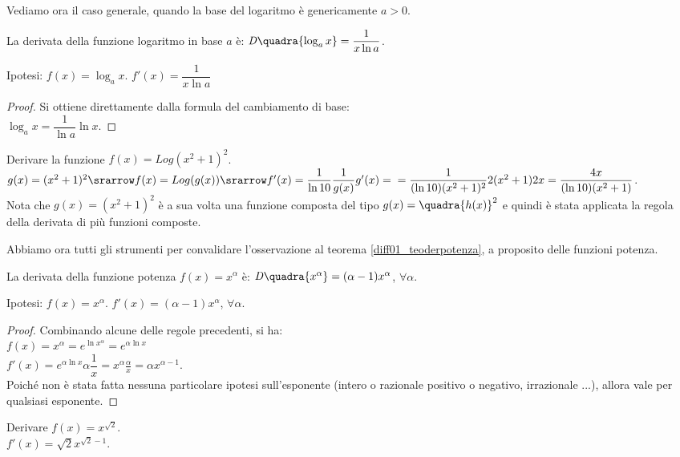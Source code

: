 Vediamo ora il caso generale, quando la base del logaritmo è genericamente $a>0$.
\begin{teorema}
  La derivata della funzione logaritmo in base $a$ è: 
  $\mathit{D}\quadra{\log_a x}= \dfrac{1}{x\ln a}$.
\end{teorema}
\noindent Ipotesi: $f(x)=\log_a x$. \tab $f'(x)=\dfrac{1}{x\ln a}$
\begin{proof}
Si ottiene direttamente dalla formula del cambiamento di base:\\
$\log_a x=\dfrac{1}{\ln a}\ln x$.
\end{proof}

\begin{esempio}
    Derivare la funzione $f(x)=Log(x^2+1)^2$.\\
    $g(x)=(x^2+1)^2\srarrow f(x)=Log (g(x))\srarrow f'(x)=\dfrac{1}{\ln 10}
    \dfrac{1}{g(x)}g'(x)=\\
    =\dfrac{1}{(\ln 10)(x^2+1)^2}2(x^2+1)2x=\dfrac{4x}{(\ln 10)(x^2+1)}$.\\
    Nota che $g(x)=(x^2+1)^2$ è a sua volta una funzione composta del tipo 
    $g(x)=\quadra{h(x)}^2$ e quindi è stata applicata la regola della derivata
    di più funzioni composte.
\end{esempio}

Abbiamo ora tutti gli strumenti per convalidare l'osservazione al teorema 
\ref{diff01_teoderpotenza}, a proposito delle funzioni potenza.

\begin{teorema}
  La derivata della funzione potenza $f(x)=x^\alpha$ è: \hspace{5mm}
  $\mathit{D}\quadra{x^\alpha}=(\alpha-1)x^\alpha$, $\forall\alpha$.
\end{teorema}
\noindent Ipotesi: $f(x)=x^\alpha$. \tab $f'(x)=(\alpha-1)x^\alpha$, 
$\forall \alpha$.
\begin{proof}
Combinando alcune delle regole precedenti, si ha:\\
$f(x)=x^\alpha=e^{\ln x^\alpha}=e^{\alpha\ln x}$\\
$f'(x)=e^{\alpha\ln x}\alpha\dfrac{1}{x}=x^\alpha\frac{\alpha}{x}=
\alpha x^{\alpha-1}$.\\
Poiché non è stata fatta nessuna particolare ipotesi sull'esponente (intero o 
razionale positivo o negativo, irrazionale ...), allora vale per qualsiasi
esponente.
\end{proof}

\begin{esempio}
  Derivare $f(x)=x^{\sqrt{2}}$.\\
  $f'(x)=\sqrt{2}x^{\sqrt{2}-1}$.
\end{esempio}

